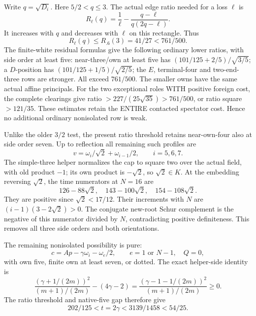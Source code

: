 \documentclass[11pt]{article}
\begin{document}
Write \(q=\sqrt{D_i}\).  Here \(5/2<q\le3\).
The actual edge ratio needed for a loss \(\ell\) is
\[
 R_\ell(q)={\frac{1}{\ell}}
                -{\frac{q-\ell}{q(2q-\ell)}}.
\]
It increases with \(q\) and decreases with \(\ell\) on this
rectangle.  Thus
\[
 R_\ell(q)\le R_{.6}(3)=41/27<761/500.
\]
The finite-white residual formulas give the following ordinary
lower ratios, with side order at least five:
near-three/own at least five has
\((101/125+2/5)/\sqrt{3/5}\);
a \(D\)-position has
\((101/125+1/5)/\sqrt{2/5}\);
the \(E\), terminal-four and two-end-three rows are stronger.
All exceed \(761/500\).
The smaller owns have the same actual affine principals.
For the two exceptional roles WITH positive foreign cost,
the complete clearings give ratio
\(>227/(25\sqrt{35})>761/500\), or ratio square \(>121/35\).
These estimates retain the ENTIRE contacted spectator cost.
Hence no additional ordinary nonisolated row is weak.

Unlike the older \(3/2\) test, the present ratio threshold retains
near-own-four also at side order seven.  Up to reflection all
remaining such profiles are
\[
          v=\omega_i/\sqrt2+\omega_{i-1}/2,\qquad i=5,6,7 .
\]
The simple-three helper normalizes the cap to square two over the
actual field, with old product \(-1\); its own product is
\(-\sqrt2\), so \(\sqrt2\in K\).
At the embedding reversing \(\sqrt2\), the time numerators at
\(N=16\) are
\[
        126-88\sqrt2,\quad143-100\sqrt2,\quad154-108\sqrt2 .
\]
They are positive since \(\sqrt2<17/12\).
Their increments with \(N\) are
\((i-1)(3-2\sqrt2)>0\).
The conjugate new-root Schur complement is the negative of this
numerator divided by \(N\), contradicting positive definiteness.
This removes all three side orders and both orientations.

The remaining nonisolated possibility is pure:
\[
 c=Ap-\gamma\omega_i-\omega_e/2,\qquad
 e=1\text{ or }N-1,\quad Q=0,
\]
with own five, finite own at least seven, or dotted.
The exact helper-side identity is
\[
 {\frac{(\gamma+1/(2m))^2}{(m+1)/(2m)}}-(4\gamma-2)
 ={\frac{(\gamma-1-1/(2m))^2}{(m+1)/(2m)}}\ge0.
\]
The ratio threshold and native-five gap therefore give
\[
             202/125<t=2\gamma<3139/1458<54/25.
\tag{Astrip}\label{eq:arithAhelperphysical}
\]
\end{document}
